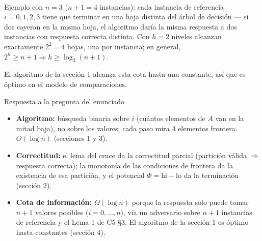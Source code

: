 \documentclass[11pt]{article}
\begin{document}
\begin{center}
\\[10pt]
{\footnotesize Ejemplo con $n=3$ ($n{+}1=4$ instancias): cada instancia de referencia $i=0,1,2,3$ tiene que
terminar en una hoja distinta del árbol de decisión --- si dos cayeran en la misma hoja, el algoritmo daría
la misma respuesta a dos instancias con respuesta correcta distinta. Con $h=2$ niveles alcanzan exactamente
$2^2=4$ hojas, una por instancia; en general, $2^h\ge n+1 \Rightarrow h\ge\log_2(n+1)$.}
\end{center}

El algoritmo de la sección 1 alcanza esta cota hasta una constante, así que es óptimo en el modelo de
comparaciones.

\begin{resultado}{Respuesta a la pregunta del enunciado}
\begin{itemize}[leftmargin=14pt]
\item \textbf{Algoritmo:} búsqueda binaria sobre $i$ (cuántos elementos de $A$ van en la mitad baja), no
sobre los valores; cada paso mira 4 elementos frontera. $O(\log n)$ (secciones 1 y 3).
\item \textbf{Correctitud:} el lema del cruce da la correctitud parcial (partición válida $\Rightarrow$
respuesta correcta); la monotonía de las condiciones de frontera da la existencia de esa partición, y el
potencial $\Phi=\mathrm{hi}-\mathrm{lo}$ da la terminación (sección 2).
\item \textbf{Cota de información:} $\Omega(\log n)$ porque la respuesta solo puede tomar $n+1$ valores
posibles ($i=0,\dots,n$), vía un adversario sobre $n+1$ instancias de referencia y el Lema 1 de C5 §3. El
algoritmo de la sección 1 es óptimo hasta constantes (sección 4).
\end{itemize}
\end{resultado}
\end{document}
